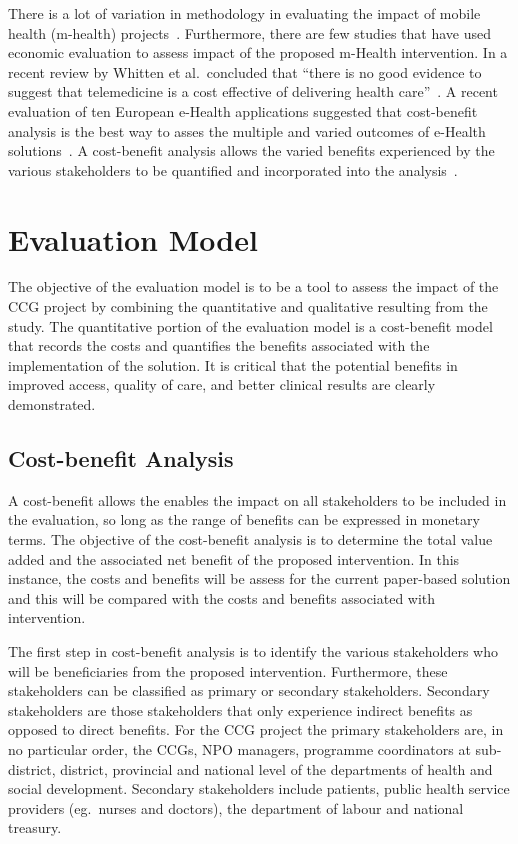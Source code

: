 There is a lot of variation in methodology in evaluating the 
impact of mobile health (m-health) projects~\cite{Vital2008_mHealth_4Dev}. 
Furthermore, there are few studies that have used economic 
evaluation to assess impact of the proposed m-Health 
intervention. In a recent review by Whitten et al.~concluded that 
``there is no good evidence  to suggest that telemedicine is 
a cost effective of delivering health 
care''~\cite{Whitten2002_telemedicine_CEA}. A recent evaluation of 
ten European e-Health applications suggested that 
cost-benefit analysis is the best way to asses the multiple 
and varied outcomes of e-Health 
solutions~\cite{Stroetmann2007_EU_eHealth_rev}.
A cost-benefit analysis allows the varied benefits experienced by 
the various stakeholders to be quantified and incorporated into the 
analysis~\cite{Drummond1977_health_economics}. 

\section*{Evaluation Model}

The objective of the evaluation model is to be a tool to assess 
the impact of the CCG project by combining the quantitative and 
qualitative resulting from the study. The quantitative portion 
of the evaluation model is a cost-benefit model that 
records the costs and quantifies the benefits associated with the 
implementation of the solution. It is critical that 
the potential benefits in improved access, quality of care, and 
better clinical results are clearly demonstrated. 

\subsection*{Cost-benefit Analysis}

A cost-benefit allows the enables the impact on all stakeholders to be 
included in the evaluation, so long as the range of benefits can be 
expressed in monetary terms. The objective of the cost-benefit analysis 
is to determine the total value added and the associated net benefit 
of the proposed intervention. In this instance, the costs and benefits 
will be assess for the current paper-based solution and this will 
be compared with the costs and benefits associated with intervention.

The first step in cost-benefit analysis is to identify the various 
stakeholders who will be beneficiaries from the proposed intervention. 
Furthermore, these stakeholders can be classified as primary or 
secondary stakeholders. Secondary stakeholders are those stakeholders 
that only experience indirect benefits as opposed to direct benefits.
For the CCG project the primary stakeholders are, in no particular order, 
the CCGs, NPO managers, programme coordinators at sub-district, 
district, provincial and national level of the departments of 
health and social development. Secondary stakeholders include 
patients, public health service providers (eg.~nurses and doctors), 
the department of labour and national treasury.

